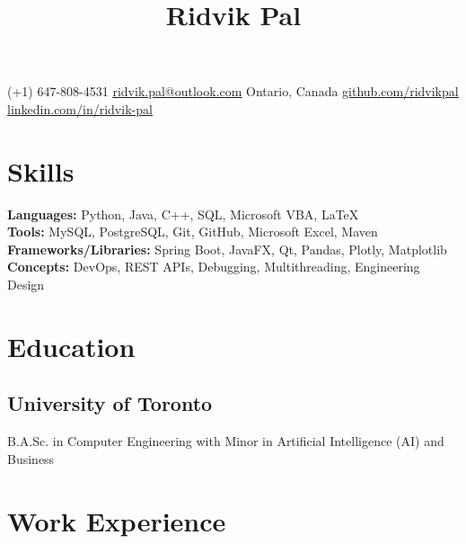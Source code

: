 \documentclass[10pt, a4paper]{article}
\begin{document}
\title{\vspace{-1.5cm}\textbf{Ridvik Pal}\vspace{-1.5cm}}
\date{}
\maketitle
\begin{center}
    (+1) 647-808-4531
    \hfill
    \href{mailto:ridvik.pal@outlook.com}{\underline{ridvik.pal@outlook.com}}
    \hfill
    Ontario, Canada
    \hfill
    \href{https://github.com/ridvikpal}{\underline{github.com/ridvikpal}}
    \hfill
    \href{https://www.linkedin.com/in/ridvik-pal}{\underline{linkedin.com/in/ridvik-pal}}
\end{center}\vspace{-10pt}

\section*{Skills}
\textbf{Languages:} Python, Java, C++, SQL, Microsoft VBA, \LaTeX \\
\textbf{Tools:} MySQL, PostgreSQL, Git, GitHub, Microsoft Excel, Maven \\
\textbf{Frameworks/Libraries:} Spring Boot, JavaFX, Qt, Pandas, Plotly, Matplotlib \\
\textbf{Concepts:} DevOps, REST APIs, Debugging, Multithreading, Engineering Design

\section*{Education}
\subsection*{University of Toronto \hfill {}}
B.A.Sc. in Computer Engineering with Minor in Artificial Intelligence (AI) and Business


\section*{Work Experience}
\end{document}
